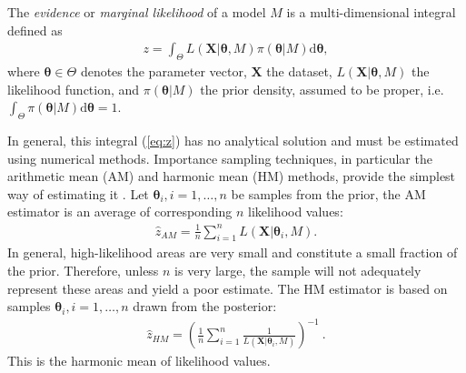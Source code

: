 \documentclass[aps,reprint,amsmath,amssymb,showpacs,showkeys]{revtex4-1}%
\begin{document}
The \textit{evidence} or \textit{marginal likelihood} of a model  $M$ is a multi-dimensional integral defined as
\begin{align}
\label{eq:z}
z = \int_{\Theta}L(\bm{X}|\bm{\theta},M)\pi(\bm{\theta}|M) \text{d} \bm{\theta},
\end{align}
where $\bm{\theta} \in \Theta$ denotes the parameter vector, $\bm{X}$ the dataset, $L(\bm{X}|\bm{\theta},M)$  the likelihood function, and $\pi(\bm{\theta}|M)$  the prior density, assumed to be proper, i.e.\ $ \int_{\Theta}\pi(\bm{\theta}|M) \text{d} \bm{\theta}=1$.

In general, this integral (\ref{eq:z}) has no analytical solution and must be estimated using numerical methods.  Importance sampling techniques, in particular the arithmetic mean (AM) and harmonic mean (HM) methods,  provide the simplest way of estimating it \citep{Newton:Raftery:1994}.
Let $\bm{\theta}_i, i=1,\ldots,n$ be samples from the prior, the AM estimator is an average of corresponding $n$ likelihood values:
\begin{align}
\label{eq:AM}
\widehat{z}_{AM} = \frac{1}{n}\sum_{i=1}^n L(\bm{X}|\bm{\theta}_i,M).
\end{align}
In general, high-likelihood areas are very small and  constitute a small fraction of the prior.  Therefore, unless $n$ is very large, the sample will not adequately represent these areas and yield a poor estimate.  The HM estimator is  based on samples 
$\bm{\theta}_i, i=1,\ldots,n$
 drawn from the posterior:
\begin{align}
\label{eq:HM}
\widehat{z}_{HM} = \left( \frac{1}{n}\sum_{i=1}^n \frac{1}{ L(\bm{X}|\bm{\theta}_i,M)} \right)^{-1} ~ .
\end{align}
This is the harmonic mean of likelihood values.
\end{document}

